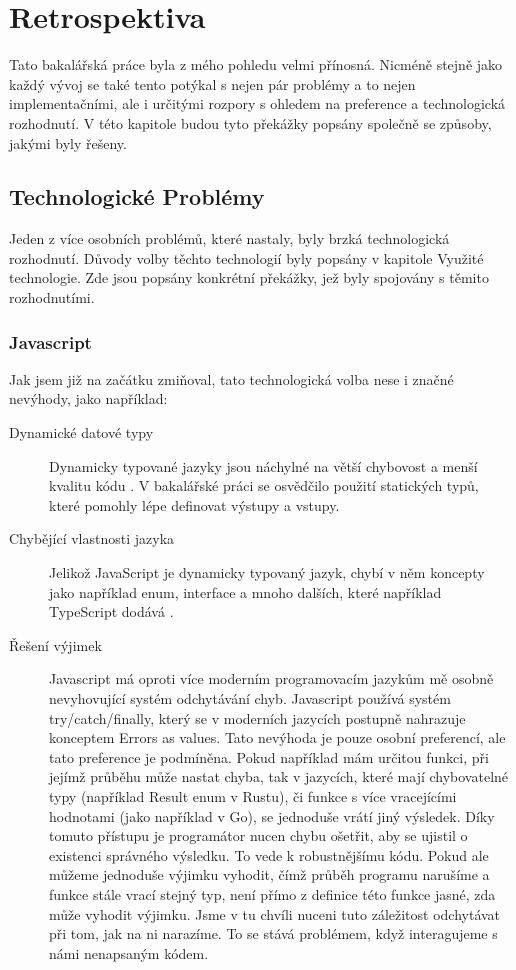 \chapter{Retrospektiva} \label{retrospective}

Tato bakalářská práce byla z mého pohledu velmi přínosná. Nicméně stejně jako každý vývoj se také tento potýkal s nejen pár problémy a to nejen implementačními, ale i určitými rozpory s ohledem na preference a technologická rozhodnutí. V této kapitole budou tyto překážky popsány společně se způsoby, jakými byly řešeny.

\section{Technologické Problémy}

Jeden z více osobních problémů, které nastaly, byly brzká technologická rozhodnutí. Důvody volby těchto technologií byly popsány v kapitole Využité technologie. Zde jsou popsány konkrétní překážky, jež byly spojovány s těmito rozhodnutími.

\subsection{Javascript}
Jak jsem již na začátku zmiňoval, tato technologická volba nese i značné nevýhody, jako například:

\begin{description}
\item[Dynamické datové typy] 
Dynamicky typované jazyky jsou náchylné na větší chybovost a menší kvalitu kódu \cite{pang2018programming}. V bakalářské práci se osvědčilo použití statických typů, které pomohly lépe definovat výstupy a vstupy.
\item[Chybějící vlastnosti jazyka] 
Jelikož JavaScript je dynamicky typovaný jazyk, chybí v něm koncepty jako například enum, interface a mnoho dalších, které například TypeScript dodává \cite{typescriptlangHandbookEnums, typescriptlangHandbookInterfaces}.
\item[Řešení výjimek]
Javascript má oproti více moderním programovacím jazykům mě osobně nevyhovující systém odchytávání chyb. Javascript používá systém try/catch/finally, který se v moderních jazycích postupně nahrazuje konceptem Errors as values. Tato nevýhoda je pouze osobní preferencí, ale tato preference je podmíněna. Pokud například mám určitou funkci, při jejímž průběhu může nastat chyba, tak v jazycích, které mají chybovatelné typy (například Result enum v Rustu), či funkce s více vracejícími hodnotami (jako například v Go), se jednoduše vrátí jiný výsledek. Díky tomuto přístupu je programátor nucen chybu ošetřit, aby se ujistil o existenci správného výsledku. To vede k robustnějšímu kódu. Pokud ale můžeme jednoduše výjimku vyhodit, čímž průběh programu narušíme a funkce stále vrací stejný typ, není přímo z definice této funkce jasné, zda může vyhodit výjimku. Jsme v tu chvíli nuceni tuto záležitost odchytávat při tom, jak na ni narazíme. To se stává problémem, když interagujeme s námi nenapsaným kódem.
\end{description}

